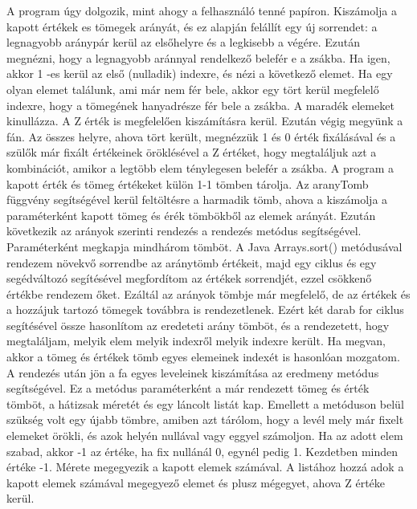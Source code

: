 
A program úgy dolgozik, mint ahogy a felhasználó tenné papíron. Kiszámolja a kapott értékek es tömegek arányát, és ez alapján felállít egy új sorrendet: a legnagyobb aránypár kerül az elsőhelyre és a legkisebb a végére. Ezután megnézni, hogy a legnagyobb aránnyal rendelkező belefér e a zsákba. Ha igen, akkor 1 -es kerül az első (nulladik) indexre, és nézi a következő elemet. Ha egy olyan elemet találunk, ami már nem fér bele, akkor egy tört kerül megfelelő indexre, hogy a tömegének hanyadrésze fér bele a zsákba. A maradék elemeket kinullázza. A Z érték is megfelelően kiszámításra kerül. Ezután végig megyünk a fán. Az összes helyre, ahova tört került, megnézzük 1 és 0 érték fixálásával és a szülők már fixált értékeinek öröklésével  a Z értéket, hogy megtaláljuk azt a kombinációt, amikor a legtöbb elem ténylegesen belefér a zsákba.
A program a kapott érték és tömeg értékeket külön 1-1 tömben tárolja. Az aranyTomb függvény segítségével kerül feltöltésre a harmadik tömb, ahova a kiszámolja a paraméterként kapott tömeg és érék tömbökből az elemek arányát. Ezután következik az arányok szerinti rendezés a rendezés metódus segítségével. Paraméterként megkapja mindhárom tömböt. A Java Arrays.sort() metódusával rendezem növekvő sorrendbe az aránytömb értékeit, majd egy ciklus és egy segédváltozó segítésével megfordítom az értékek sorrendjét, ezzel csökkenő értékbe rendezem őket. Ezáltál az arányok tömbje már megfelelő, de az értékek és a hozzájuk tartozó tömegek továbbra is rendezetlenek. Ezért két darab for ciklus segítésével össze hasonlítom az eredeteti arány tömböt, és a rendezetett, hogy megtaláljam, melyik elem melyik indexről melyik indexre került. Ha megvan, akkor a tömeg és értékek tömb egyes elemeinek indexét is hasonlóan mozgatom. 
A rendezés után jön a fa egyes leveleinek kiszámítása az eredmeny metódus segítségével. Ez a metódus paraméterként a már rendezett tömeg és érték tömböt, a hátizsak méretét és egy láncolt listát kap. Emellett a metóduson belül szükség volt egy újabb tömbre, amiben azt tárólom, hogy a levél mely már fixelt elemeket örökli, és azok helyén nullával vagy eggyel számoljon. Ha az adott elem szabad, akkor -1 az értéke, ha fix nullánál 0, egynél pedig 1. Kezdetben minden értéke -1. Mérete megegyezik a kapott elemek számával. A listához hozzá adok a kapott elemek számával megegyező elemet és plusz mégegyet, ahova Z értéke kerül.
